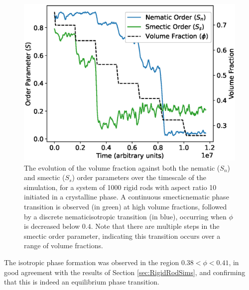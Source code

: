 \documentclass[11pt, a4paper]{article} %
\begin{document}
\begin{figure} [h!]
	\centering
	\includegraphics[width=0.7\linewidth]{Figures/rigidrod_cryorderparam}
	\caption{The evolution of the volume fraction against both the nematic ($S_{n}$) and smectic ($S_{s}$) order parameters over the timescale of the simulation, for a system of 1000 rigid rods with aspect ratio 10 initiated in a crystalline phase. A continuous smectic\textendash nematic phase transition is observed (in green) at high volume fractions, followed by a discrete nematic\textendash isotropic transition (in blue), occurring when $\phi$ is decreased below $0.4$. Note that there are multiple steps in the smectic order parameter, indicating this transition occurs over a range of volume fractions.}
	\label{fig:rr_crystalorder}
\end{figure} %


The isotropic phase formation was observed in the region $0.38 < \phi< 0.41$, in good agreement with the results of Section \ref{sec:RigidRodSims}, and confirming that this is indeed an equilibrium phase transition. 
\end{document}
